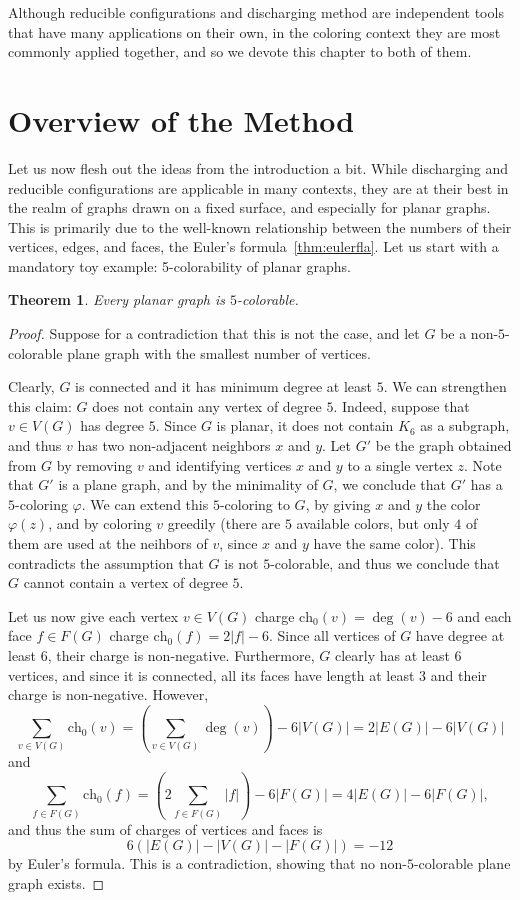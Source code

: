 \documentclass[12pt,twoside,openright,a4paper]{book}
\newtheorem{theorem}{Theorem}[chapter]
\newcommand{\initch}{\text{ch}_0}
\begin{document}
Although reducible configurations and discharging method are independent tools that have many applications on their
own, in the coloring context they are most commonly applied together, and so we devote this chapter to both of them.

\section{Overview of the Method}

Let us now flesh out the ideas from the introduction a bit.  While discharging and reducible configurations
are applicable in many contexts, they are at their best in the realm of graphs drawn on a fixed surface, and
especially for planar graphs.  This is primarily due to the well-known relationship between the numbers
of their vertices, edges, and faces, the Euler's formula~\ref{thm:eulerfla}.
Let us start with a mandatory toy example: 5-colorability of planar graphs.

\begin{theorem}\label{thm:planar5col}
Every planar graph is $5$-colorable.
\end{theorem}
\begin{proof}
Suppose for a contradiction that this is not the case, and let $G$ be a non-$5$-colorable plane graph
with the smallest number of vertices.

Clearly, $G$ is connected and it has minimum degree at least $5$.  We can strengthen this claim: $G$ does not
contain any vertex of degree $5$.  Indeed, suppose that $v\in V(G)$ has degree $5$.  Since $G$ is planar, it does
not contain $K_6$ as a subgraph, and thus $v$ has two non-adjacent neighbors $x$ and $y$.  Let $G'$ be the graph obtained
from $G$ by removing $v$ and identifying vertices $x$ and $y$ to a single vertex $z$.  Note that $G'$ is a plane graph,
and by the minimality of $G$, we conclude that $G'$ has a $5$-coloring $\varphi$.  We can extend this $5$-coloring to $G$,
by giving $x$ and $y$ the color $\varphi(z)$, and by coloring $v$ greedily (there are $5$ available colors, but only
$4$ of them are used at the neihbors of $v$, since $x$ and $y$ have the same color).  This contradicts the assumption
that $G$ is not $5$-colorable, and thus we conclude that $G$ cannot contain a vertex of degree $5$.

Let us now give each vertex $v\in V(G)$ charge $\initch(v)=\deg(v)-6$ and each face $f\in F(G)$ charge $\initch(f)=2|f|-6$.
Since all vertices of $G$ have degree at least $6$, their charge is non-negative.  Furthermore, $G$ clearly has at least $6$
vertices, and since it is connected, all its faces have length at least $3$ and their charge is non-negative.
However,
$$\sum_{v\in V(G)} \initch(v)=\left(\sum_{v\in V(G)} \deg(v)\right)-6|V(G)|=2|E(G)|-6|V(G)|$$
and
$$\sum_{f\in F(G)} \initch(f)=\left(2\sum_{f\in F(G)} |f|\right)-6|F(G)|=4|E(G)|-6|F(G)|,$$
and thus the sum of charges of vertices and faces is
$$6(|E(G)|-|V(G)|-|F(G)|)=-12$$
by Euler's formula.  This is a contradiction, showing that no non-$5$-colorable plane graph exists.
\end{proof}
\end{document}

